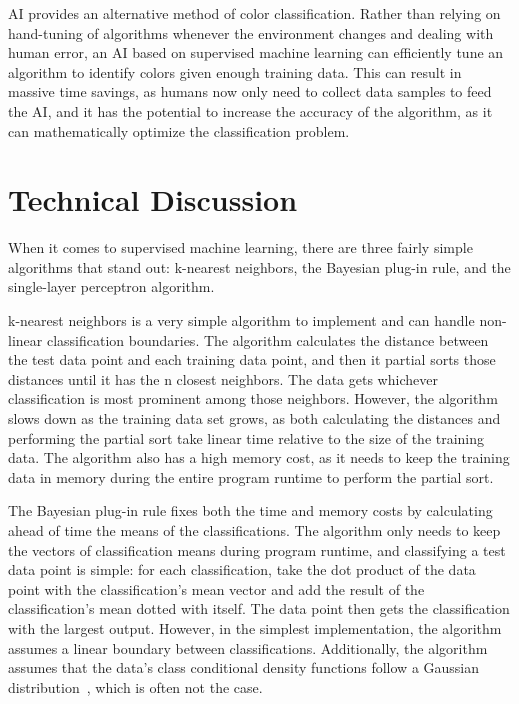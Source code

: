 \documentclass[twoside]{IEEEtran}
\begin{document}
AI provides an alternative method of color classification. Rather than relying on hand-tuning of
algorithms whenever the environment changes and dealing with human error, an AI based on
supervised machine learning can efficiently tune an algorithm to identify colors given enough
training data. This can result in massive time savings, as humans now only need to collect data
samples to feed the AI, and it has the potential to increase the accuracy of the algorithm, as it can
mathematically optimize the classification problem.

\section{Technical Discussion}

When it comes to supervised machine learning, there are three fairly simple algorithms that stand
out: k-nearest neighbors, the Bayesian plug-in rule, and the single-layer perceptron algorithm.

k-nearest neighbors is a very simple algorithm to implement and can handle non-linear
classification boundaries. The algorithm calculates the distance between the test data point and
each training data point, and then it partial sorts those distances until it has the n closest
neighbors. The data gets whichever classification is most prominent among those neighbors.
However, the algorithm slows down as the training data set grows, as both calculating the
distances and performing the partial sort take linear time relative to the size of the training data.
The algorithm also has a high memory cost, as it needs to keep the training data in memory
during the entire program runtime to perform the partial sort.

The Bayesian plug-in rule fixes both the time and memory costs by calculating ahead of time the
means of the classifications. The algorithm only needs to keep the vectors of classification means
during program runtime, and classifying a test data point is simple: for each classification, take
the dot product of the data point with the classification's mean vector and add the result of the
classification's mean dotted with itself. The data point then gets the classification with the largest
output. However, in the simplest implementation, the algorithm assumes a linear boundary
between classifications. Additionally, the algorithm assumes that the data's class conditional
density functions follow a Gaussian distribution~\cite{farmer}, which is often not the case.
\end{document}
